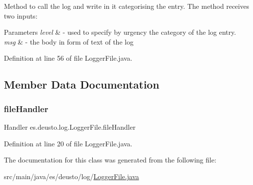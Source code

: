 Method to call the log and write in it categorising the entry. The method receives two inputs\+:~\newline

\begin{DoxyParams}{Parameters}
{\em level} & -\/ used to specify by urgency the category of the log entry. \\
\hline
{\em msg} & -\/ the body in form of text of the log \\
\hline
\end{DoxyParams}


Definition at line 56 of file Logger\+File.\+java.



\subsection{Member Data Documentation}
\mbox{\label{classes_1_1deusto_1_1log_1_1_logger_file_a9140523c75d641a5716eb51f175e9efa}} 
\subsubsection{\texorpdfstring{file\+Handler}{fileHandler}}
{\footnotesize\ttfamily Handler es.\+deusto.\+log.\+Logger\+File.\+file\+Handler}



Definition at line 20 of file Logger\+File.\+java.



The documentation for this class was generated from the following file\+:\begin{DoxyCompactItemize}
\item 
src/main/java/es/deusto/log/\hyperlink{_logger_file_8java}{Logger\+File.\+java}\end{DoxyCompactItemize}
